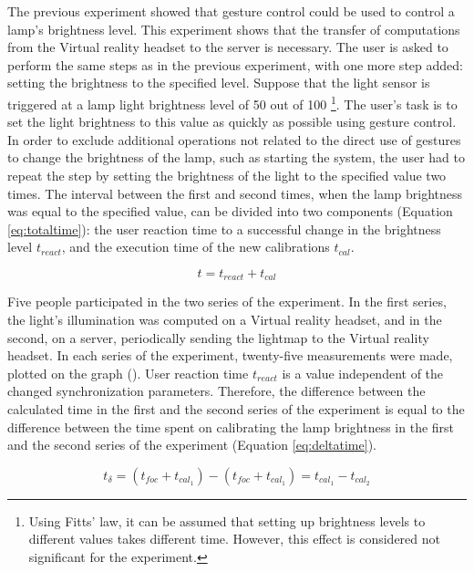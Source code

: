 The previous experiment showed that gesture control could be used to control a lamp's brightness level. This experiment shows that the transfer of computations from the Virtual reality headset to the server is necessary. The user is asked to perform the same steps as in the previous experiment, with one more step added:  setting the brightness to the specified level. Suppose that the light sensor is triggered at a lamp light brightness level of 50 out of 100 \footnote{Using Fitts' law, it can be assumed that setting up brightness levels to different values takes different time. However, this effect is considered not significant for the experiment.}. The user's task is to set the light brightness to this value as quickly as possible using gesture control. In order to exclude additional operations not related to the direct use of gestures to change the brightness of the lamp, such as starting the system, the user had to repeat the step by setting the brightness of the light to the specified value two times. The interval between the first and second times, when the lamp brightness was equal to the specified value, can be divided into two components (Equation \eqref{eq:totaltime}): the user reaction time to a successful change in the brightness level $ t_{react} $, and the execution time of the new calibrations $ t_{cal} $.

\begin{equation}
  t = t_{react} + t_{cal}
  \label{eq:totaltime}
\end{equation}

Five people participated in the two series of the experiment. In the first series, the light's illumination was computed on a Virtual reality headset, and in the second, on a server, periodically sending the lightmap to the Virtual reality headset. In each series of the experiment, twenty-five measurements were made, plotted on the graph (). User reaction time $ t_{react} $ is a value independent of the changed synchronization parameters. Therefore, the difference between the calculated time in the first and the second series of the experiment is equal to the difference between the time spent on calibrating the lamp brightness in the first and the second series of the experiment (Equation \eqref{eq:deltatime}).

\begin{equation}
  t _{\delta} = (t_{foc} + t_{cal_1}) - (t_{foc} + t_{cal_1}) = t_{cal_1} - t_{cal_2}
  \label{eq:deltatime}
\end{equation}

